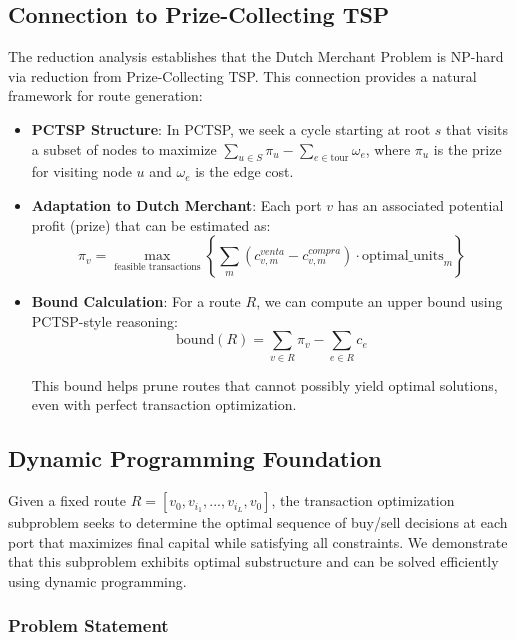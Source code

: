 \documentclass[12pt]{article}
\begin{document}
\subsection{Connection to Prize-Collecting TSP}

The reduction analysis \cite{reduccion2025} establishes that the Dutch Merchant Problem is NP-hard via reduction from Prize-Collecting TSP. This connection provides a natural framework for route generation:

\begin{itemize}
    \item \textbf{PCTSP Structure}: In PCTSP, we seek a cycle starting at root $s$ that visits a subset of nodes to maximize $\sum_{u \in S} \pi_u - \sum_{e \in \text{tour}} \omega_e$, where $\pi_u$ is the prize for visiting node $u$ and $\omega_e$ is the edge cost.
    
    \item \textbf{Adaptation to Dutch Merchant}: Each port $v$ has an associated potential profit (prize) that can be estimated as:
    $$\pi_v = \max_{\text{feasible transactions}} \left\{ \sum_{m} (c_{v,m}^{venta} - c_{v,m}^{compra}) \cdot \text{optimal\_units}_m \right\}$$
    
    \item \textbf{Bound Calculation}: For a route $R$, we can compute an upper bound using PCTSP-style reasoning:
    $$\text{bound}(R) = \sum_{v \in R} \pi_v - \sum_{e \in R} c_e$$
    
    This bound helps prune routes that cannot possibly yield optimal solutions, even with perfect transaction optimization.
\end{itemize}

\subsection{Dynamic Programming Foundation}

Given a fixed route $R = [v_0, v_{i_1}, ..., v_{i_L}, v_0]$, the transaction optimization subproblem seeks to determine the optimal sequence of buy/sell decisions at each port that maximizes final capital while satisfying all constraints. We demonstrate that this subproblem exhibits optimal substructure and can be solved efficiently using dynamic programming.

\subsubsection{Problem Statement}
\end{document}
